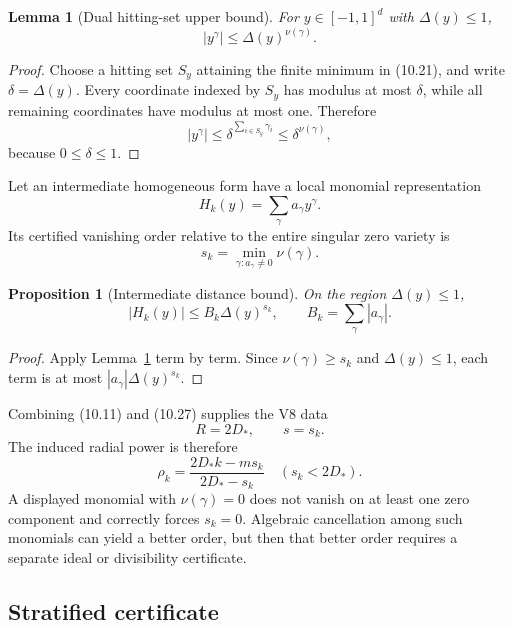\documentclass[11pt]{article}
\newtheorem{proposition}[theorem]{Proposition}
\newtheorem{lemma}[theorem]{Lemma}
\theoremstyle{remark}
\begin{document}
\begin{lemma}[Dual hitting-set upper bound]
\label{lem:v17v10-dual-upper}
For \(y\in[-1,1]^d\) with \(\Delta(y)\leq1\),
\[
 |y^\gamma|\leq\Delta(y)^{\nu(\gamma)}.            \tag{10.23}
\]
\end{lemma}

\begin{proof}
Choose a hitting set \(S_y\) attaining the finite minimum in
(10.21), and write \(\delta=\Delta(y)\).  Every coordinate indexed
by \(S_y\) has modulus at most \(\delta\), while all remaining
coordinates have modulus at most one.  Therefore
\[
 |y^\gamma|
 \leq
 \delta^{\sum_{i\in S_y}\gamma_i}
 \leq
 \delta^{\nu(\gamma)},                             \tag{10.24}
\]
because \(0\leq\delta\leq1\).
\end{proof}

Let an intermediate homogeneous form have a local monomial
representation
\[
 H_k(y)=\sum_\gamma a_\gamma y^\gamma.              \tag{10.25}
\]
Its certified vanishing order relative to the entire singular zero
variety is
\[
 s_k=\min_{\gamma:a_\gamma\ne0}\nu(\gamma).        \tag{10.26}
\]

\begin{proposition}[Intermediate distance bound]
\label{prop:v17v10-upper}
On the region \(\Delta(y)\leq1\),
\[
 |H_k(y)|
 \leq B_k\Delta(y)^{s_k},
 \qquad B_k=\sum_\gamma|a_\gamma|.                 \tag{10.27}
\]
\end{proposition}

\begin{proof}
Apply Lemma~\ref{lem:v17v10-dual-upper} term by term.  Since
\(\nu(\gamma)\geq s_k\) and \(\Delta(y)\leq1\), each term is at
most \(|a_\gamma|\Delta(y)^{s_k}\).
\end{proof}

Combining (10.11) and (10.27) supplies the V8 data
\[
 R=2D_*,\qquad s=s_k.                               \tag{10.28}
\]
The induced radial power is therefore
\[
 \rho_k=
 \frac{2D_*k-ms_k}{2D_*-s_k}
 \quad(s_k<2D_*).                                  \tag{10.29}
\]
A displayed monomial with \(\nu(\gamma)=0\) does not vanish on at
least one zero component and correctly forces \(s_k=0\).  Algebraic
cancellation among such monomials can yield a better order, but then
that better order requires a separate ideal or divisibility
certificate.
\subsection{Stratified certificate}
\end{document}

